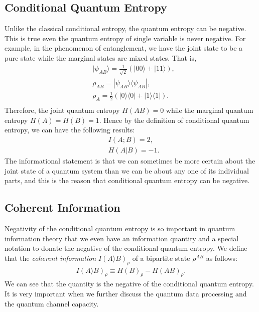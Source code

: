 \subsection{Conditional Quantum Entropy}
Unlike the classical conditional entropy, the quantum entropy can be negative.
This is true even the quantum entropy of single variable is never negative.
For example, in the phenomenon of entanglement, we have the joint state to be a pure state while the marginal states are mixed states.
That is,
\begin{align}
& |\psi_{AB} \rangle = \frac{1}{\sqrt{2}}(|00\rangle + |11\rangle), \nonumber \\
& \rho_{AB}= |\psi_{AB} \rangle \langle \psi_{AB}|, \nonumber \\
& \rho_A=\frac{1}{2}(|0\rangle \langle 0| + |1\rangle \langle 1|). \\
\end{align}
Therefore, the joint quantum entropy $H(AB) = 0$ while the marginal quantum entropy $H(A) = H(B) = 1$.
Hence by the definition of conditional quantum entropy, we can have the following results:
\begin{align}
&I(A;B)=2, \nonumber \\
&H(A|B)=-1. 
\end{align}
The informational statement is that we can sometimes be more certain about the joint state of a quantum system than we can be about any one of its individual parts, and this is the reason that conditional  quantum entropy can be negative.

\subsection{Coherent Information}
Negativity of the conditional quantum entropy is so important in quantum information theory that we even have an information quantity and a special notation to donate the negative of the conditional quantum entropy.
We define that the \textit{coherent information} $I(A\rangle B)_{\rho}$ of a bipartite state $\rho^{AB}$ as follows:
\begin{align}
I(A\rangle B)_{\rho} \equiv H(B)_{\rho}-H(AB)_{\rho}.
\end{align}
We can see that the quantity is the negative of the conditional quantum entropy. It is very important when we further discuss the quantum data processing and the quantum channel capacity.